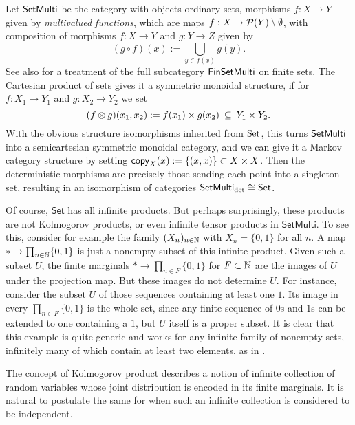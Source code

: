 \documentclass[11pt]{article}
\renewcommand{\sf}{\mathsf}
\begin{document}
\begin{example}
    \label{setmulti}
    Let $\operatorname{\mathsf{SetMulti}}$ be the category with objects ordinary sets, morphisms $f: X \to Y$ given by \emph{multivalued functions}, which are maps $f: X \to \mathcal{P}(Y)\setminus \emptyset$, with composition of morphisms $f : X \to Y$ and $g : Y \to Z$ given by
    	\begin{equation}
		\label{relational_composition}
		(g\circ f)(x) := \bigcup_{y \in f(x)} g(y).
	\end{equation}
    See also \cite[Example~2.6]{markov_cats} for a treatment of the full subcategory $\operatorname{\mathsf{FinSetMulti}}$ on finite sets.
    The Cartesian product of sets gives it a symmetric monoidal structure, if for $f : X_1 \to Y_1$ and $g: X_2 \to Y_2$ we set
	\[
	(f \otimes g)(x_1,x_2) := f(x_1) \times g(x_2) \:\subseteq\: Y_1 \times Y_2.
	\]
	With the obvious structure isomorphisms inherited from $\operatorname{Set}$, this turns $\operatorname{\mathsf{SetMulti}}$ into a semicartesian symmetric monoidal category, and we can give it a Markov category structure by setting
    $\mathsf{copy}_{X}(x) := \{(x,x)\} \subset X \times X$.
    Then the deterministic morphisms are precisely those sending each point into a singleton set, resulting in an isomorphism of categories
    $\SetMulti_\detc \cong \sf{Set}$.

    Of course, $\sf{Set}$ has all infinite products. But perhaps surprisingly, these products are not Kolmogorov products, or even infinite tensor products in $\sf{SetMulti}$.
    To see this, consider for example the family $(X_n)_{n\in\mathbb{N}}$ with $X_n = \{0,1\}$ for all $n$. 
    A map $* \to \prod_{n\in \mathbb{N}} \{0,1\}$ is just a nonempty subset of this infinite product.
    Given such a subset $U$, the finite marginals $* \to \prod_{n \in F} \{0,1\}$ for $F \subset \mathbb{N}$ are the images of $U$ under the projection map.
    But these images do not determine $U$. For instance, consider the subset $U$ of those sequences containing at least one $1$.
    Its image in every $\prod_{n \in F} \{0,1\}$ is the whole set, since any finite sequence of $0$s and $1$s can be extended to one containing a $1$, but $U$ itself is a proper subset. It is clear that this example is quite generic and works for any infinite family of nonempty sets, infinitely many of which contain at least two elements, as in .

\end{example}

The concept of Kolmogorov product describes a notion of infinite collection of random variables whose joint distribution is encoded in its finite marginals. It is natural to postulate the same for when such an infinite collection is considered to be independent.
\end{document}
